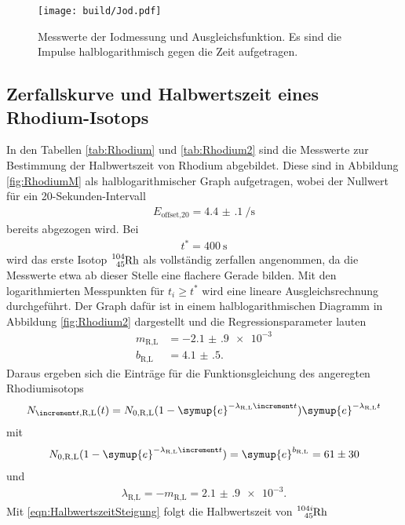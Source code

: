 \begin{figure}
  \centering
  \texttt{[image: build/Jod.pdf]}
  \caption{Messwerte der Iodmessung und Ausgleichsfunktion. Es sind
  die Impulse halblogarithmisch gegen die Zeit aufgetragen.}
  \label{fig:Iod}
\end{figure}

\subsection{Zerfallskurve und Halbwertszeit eines Rhodium-Isotops}

In den Tabellen \ref{tab:Rhodium} und \ref{tab:Rhodium2} sind die Messwerte
zur Bestimmung der Halbwertszeit von Rhodium abgebildet.
Diese sind in Abbildung \ref{fig:RhodiumM} als halblogarithmischer Graph
aufgetragen, wobei der Nullwert für ein 20-Sekunden-Intervall
\begin{align}
  E_\text{offset,20} = \SI{4.4(1)}{\per\second}
\end{align}
bereits abgezogen wird.
Bei
\begin{align}
  t^* = \SI{400}{\second}
\end{align}
wird das erste Isotop $\ce{^{104}_{45}Rh}$ als vollständig zerfallen angenommen, da die
Messwerte etwa ab dieser Stelle eine flachere Gerade bilden.
Mit den logarithmierten Messpunkten für $t_i \geq t^*$ wird eine
lineare Ausgleichsrechnung durchgeführt.
Der Graph dafür ist in einem halblogarithmischen Diagramm in Abbildung
\ref{fig:Rhodium2} dargestellt und die Regressionsparameter lauten
\begin{align}
  m_\text{R,L} & = -\num{2.1(9)e-3} \\
  b_\text{R,L} & = \num{4.1(5)}.
\end{align}
Daraus ergeben sich die Einträge für die Funktionsgleichung des angeregten
Rhodiumisotops
\begin{align}
  N_{\increment t,\text{R,L}} (t) = N_\text{0,R,L}(1-
  \symup{e}^{-\lambda_\text{R,L}\increment t})\symup{e}^{-\lambda_\text{R,L}t}
  \label{eqn:RhodiumL}
\end{align}
mit
\begin{align}
  N_\text{0,R,L}(1-\symup{e}^{-\lambda_\text{R,L}\increment t}) =
  \symup{e}^{b_\text{R,L}} = \num{61(30)}
\end{align}
und
\begin{align}
  \lambda_\text{R,L} = -m_\text{R,L} = \num{2.1(9)e-3}.
\end{align}
Mit \eqref{eqn:HalbwertszeitSteigung} folgt die Halbwertszeit von $\ce{^{104i}_{45}Rh}$
